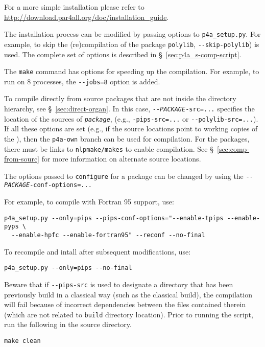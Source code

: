 \documentclass[a4paper]{article}
\begin{document}
For a more simple installation please refer to \url{http://download.par4all.org/doc/installation_guide}.

The installation process can be modified by passing options to
\verb|p4a_setup.py|. For example, to skip the (re)compilation of the
package \texttt{polylib},
\verb/--skip-polylib/) is used. The complete set of options is described in
\S~\ref{sec:p4a_s-comp-script}.

The \texttt{make} command has options for speeding up the compilation. For
example, to run on 8 processes, the \verb/--jobs=8/ option is added.

To compile \Apfa directly from source packages that are not
inside the \Apfa directory hierarchy, see \S~\ref{sec:direct-organ}. In
this case, \texttt{-{}-\emph{PACKAGE}-src=...} specifies the
location of the sources of \texttt{\emph{package}}, (e.g.,
\verb|-pips-src=...| or \verb|--polylib-src=...|). If all these options are
set (e.g., if the source locations point to working copies of the
\Apips{} \Asvn), then the \texttt{p4a-own} branch can be used for
compilation. For the \Apips
packages, there must be links to \texttt{nlpmake/makes} to enable compilation.
See \S~\ref{sec:comp-from-sourc} for more information on alternate
source locations.

The options passed to \texttt{configure} for a package can be changed by
using the \texttt{-{}-\emph{PACKAGE}-conf-options=...}

For example, to compile \Apips with Fortran 95 support, use:
\begin{verbatim}
p4a_setup.py --only=pips --pips-conf-options="--enable-tpips --enable-pyps \
  --enable-hpfc --enable-fortran95" --reconf --no-final
\end{verbatim}

To recompile and intall \Apips after subsequent modifications, use:
\begin{verbatim}
p4a_setup.py --only=pips --no-final
\end{verbatim}

Beware that if \verb|--pips-src| is used to designate a \Apips
directory that has been previously build in a classical way (such as
the classical \Asvn build), the compilation will fail because of
incorrect dependencies between the files contained therein (which are not
related to \Apfa \texttt{build} directory location). Prior to running
the script, run the following in the \Apips source directory.
\begin{verbatim}
make clean
\end{verbatim}
\end{document}
